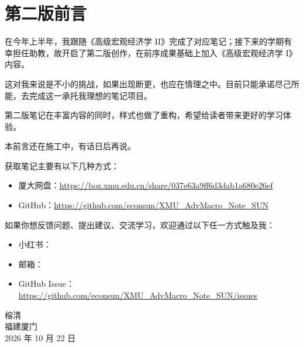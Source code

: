 \cleardoublepage
\pagestyle{symplain}
\thispagestyle{symplain}

\chapter*{第二版前言}
\vspace{\baselineskip}

在今年上半年，我跟随《高级宏观经济学 II》完成了对应笔记；接下来的学期有幸担任助教，故开启了第二版创作，在前序成果基础上加入《高级宏观经济学 I》内容。

这对我来说是不小的挑战，如果出现断更，也应在情理之中。目前只能承诺尽己所能，去完成这一承托我理想的笔记项目。

第二版笔记在丰富内容的同时，样式也做了重构，希望给读者带来更好的学习体验。

本前言还在施工中，有话日后再说。


获取笔记主要有以下几种方式：
\begin{itemize}
    \item 厦大网盘：\url{https://box.xmu.edu.cn/share/037e63a9ff6d3dab1a680e26ef}
    \item GitHub：\url{https://github.com/econsun/XMU_AdvMacro_Note_SUN}
\end{itemize}


如果你想反馈问题、提出建议、交流学习，欢迎通过以下任一方式触及我：
\begin{itemize}
    \item 小红书：
    \item 邮箱：
    \item GitHub Issue：\url{https://github.com/econsun/XMU_AdvMacro_Note_SUN/issues}
\end{itemize}


\vspace{\baselineskip}
\begin{flushright}
榕清\\
福建\hspace{0.35em}\textperiodcentered\hspace{0.35em}厦门\\
2026 年 10 月 22 日
\end{flushright}

\clearpage
\pagestyle{symplain}
